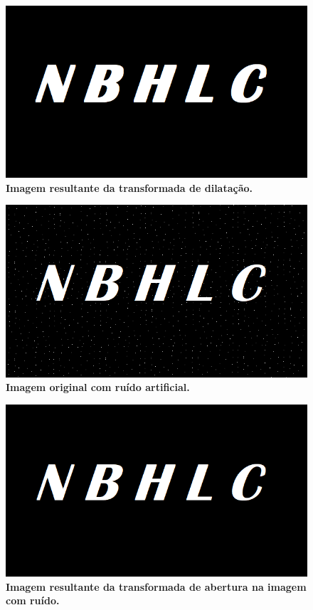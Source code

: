 \documentclass[
12pt,        %
oneside,     %
a4paper,     %
english,       %
brazil        %
%
%
]{ppgca}
\begin{document}
\begin{figure}[H]
    \includegraphics[scale=0.6]{dilatacao.png}
    \centering
    \caption{\textbf{Imagem resultante da transformada de dilatação.}}
    \label{fig:dilatacao}
\end{figure}

\begin{figure}[H]
    \includegraphics{imagemruido.png}
    \centering
    \caption{\textbf{Imagem original com ruído artificial.}}
    \label{fig:imagemruido}
\end{figure}

\begin{figure}[H]
    \includegraphics[scale=0.6]{opening.png}
    \centering
    \caption{\textbf{Imagem resultante da transformada de abertura na imagem com ruído.}}
    \label{fig:opening}
\end{figure}
\end{document}
